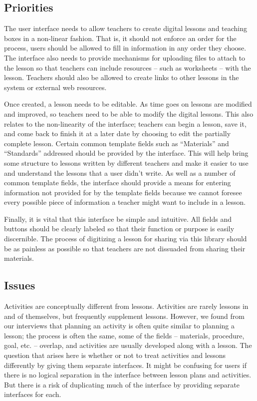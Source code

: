 \documentclass[10pt,letter]{article}
\begin{document}
\subsection{Priorities}
The user interface needs to allow teachers to create digital lessons and
teaching boxes in a non-linear fashion. That is, it should not enforce an order
for the process, users should be allowed to fill in information in any order
they choose. The interface also needs to provide mechanisms for uploading files
to attach to the lesson so that teachers can include resources -- such as
worksheets -- with the lesson. Teachers should also be allowed to create links
to other lessons in the system or external web resources.

Once created, a lesson needs to be editable. As time goes on lessons are
modified and improved, so teachers need to be able to modify the digital
lessons. This also relates to the non-linearity of the interface; teachers can
begin a lesson, save it, and come back to finish it at a later date by choosing
to edit the partially complete lesson. Certain common template fields such as
``Materials'' and ``Standards'' addressed should be provided by the interface.
This will help bring some structure to lessons written by different teachers and
make it easier to use and understand the lessons that a user didn't write. As
well as a number of common template fields, the interface should provide a means
for entering information not provided for by the template fields because we
cannot foresee every possible piece of information a teacher might want to
include in a lesson.

Finally, it is vital that this interface be simple and intuitive. All fields and
buttons should be clearly labeled so that their function or purpose is easily
discernible. The process of digitizing a lesson for sharing via this library
should be as painless as possible so that teachers are not dissuaded from
sharing their materials.

\subsection{Issues}
\label{sec: issues}
Activities are conceptually different from lessons. Activities are rarely
lessons in and of themselves, but frequently supplement lessons. However,
we found from our interviews that planning an activity is often quite similar to
planning a lesson; the process is often the same, some of the fields --
materials, procedure, goal, etc. -- overlap, and activities are usually
developed along with a lesson. The question that arises here is whether or not
to treat activities and lessons differently by giving them separate interfaces.
It might be confusing for users if there is no logical separation in the
interface between lesson plans and activities. But there is a risk of
duplicating much of the interface by providing separate interfaces for each.
\end{document}
